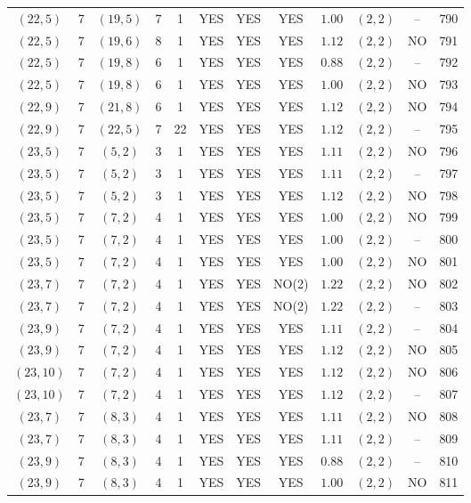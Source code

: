 \begin{longtable}{|c|c|c|c|c|c|c|c|c|c|c|c|}
$(22,5)$ & 7 & $(19,5)$ & 7 & 1 & YES & YES & YES & $1.00$ & $(2,2)$ & -- & 790\\
$(22,5)$ & 7 & $(19,6)$ & 8 & 1 & YES & YES & YES & $1.12$ & $(2,2)$ & NO & 791\\
$(22,5)$ & 7 & $(19,8)$ & 6 & 1 & YES & YES & YES & $0.88$ & $(2,2)$ & -- & 792\\
$(22,5)$ & 7 & $(19,8)$ & 6 & 1 & YES & YES & YES & $1.00$ & $(2,2)$ & NO & 793\\
$(22,9)$ & 7 & $(21,8)$ & 6 & 1 & YES & YES & YES & $1.12$ & $(2,2)$ & NO & 794\\
$(22,9)$ & 7 & $(22,5)$ & 7 & 22 & YES & YES & YES & $1.12$ & $(2,2)$ & -- & 795\\
$(23,5)$ & 7 & $(5,2)$ & 3 & 1 & YES & YES & YES & $1.11$ & $(2,2)$ & NO & 796\\
$(23,5)$ & 7 & $(5,2)$ & 3 & 1 & YES & YES & YES & $1.11$ & $(2,2)$ & -- & 797\\
$(23,5)$ & 7 & $(5,2)$ & 3 & 1 & YES & YES & YES & $1.12$ & $(2,2)$ & NO & 798\\
$(23,5)$ & 7 & $(7,2)$ & 4 & 1 & YES & YES & YES & $1.00$ & $(2,2)$ & NO & 799\\
$(23,5)$ & 7 & $(7,2)$ & 4 & 1 & YES & YES & YES & $1.00$ & $(2,2)$ & -- & 800\\
$(23,5)$ & 7 & $(7,2)$ & 4 & 1 & YES & YES & YES & $1.00$ & $(2,2)$ & NO & 801\\
$(23,7)$ & 7 & $(7,2)$ & 4 & 1 & YES & YES & NO(2) & $1.22$ & $(2,2)$ & NO & 802\\
$(23,7)$ & 7 & $(7,2)$ & 4 & 1 & YES & YES & NO(2) & $1.22$ & $(2,2)$ & -- & 803\\
$(23,9)$ & 7 & $(7,2)$ & 4 & 1 & YES & YES & YES & $1.11$ & $(2,2)$ & -- & 804\\
$(23,9)$ & 7 & $(7,2)$ & 4 & 1 & YES & YES & YES & $1.12$ & $(2,2)$ & NO & 805\\
$(23,10)$ & 7 & $(7,2)$ & 4 & 1 & YES & YES & YES & $1.12$ & $(2,2)$ & NO & 806\\
$(23,10)$ & 7 & $(7,2)$ & 4 & 1 & YES & YES & YES & $1.12$ & $(2,2)$ & -- & 807\\
$(23,7)$ & 7 & $(8,3)$ & 4 & 1 & YES & YES & YES & $1.11$ & $(2,2)$ & NO & 808\\
$(23,7)$ & 7 & $(8,3)$ & 4 & 1 & YES & YES & YES & $1.11$ & $(2,2)$ & -- & 809\\
$(23,9)$ & 7 & $(8,3)$ & 4 & 1 & YES & YES & YES & $0.88$ & $(2,2)$ & -- & 810\\
$(23,9)$ & 7 & $(8,3)$ & 4 & 1 & YES & YES & YES & $1.00$ & $(2,2)$ & NO & 811\\

\end{longtable}
